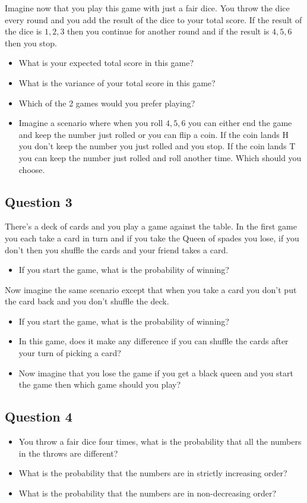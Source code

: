 \documentclass{article}
\begin{document}
Imagine now that you play this game with just a fair dice.
You throw the dice every round and you add the result of the dice to your total score.
If the result of the dice is $1,2,3$ then you continue for another round and if the result is $4,5,6$ then you stop.
\begin{itemize}
    \item What is your expected total score in this game?
    \item What is the variance of your total score in this game?
    \item Which of the 2 games would you prefer playing?
    \item Imagine a scenario where when you roll $4,5,6$ you can either end the game and keep the number just rolled or you can flip a coin. If the coin lands H you don't keep the number you just rolled and you stop. If the coin lands T you can keep the number just rolled and roll another time. Which should you choose.
\end{itemize}

\subsection{Question 3}
There's a deck of cards and you play a game against the table.
In the first game you each take a card in turn and if you take the Queen of spades you lose, if you don't then you shuffle the cards and your friend takes a card.
\begin{itemize}
    \item If you start the game, what is the probability of winning?
\end{itemize}
Now imagine the same scenario except that when you take a card you don't put the card back and you don't shuffle the deck.
\begin{itemize}
    \item If you start the game, what is the probability of winning?
    \item In this game, does it make any difference if you can shuffle the cards after your turn of picking a card?
    \item Now imagine that you lose the game if you get a black queen and you start the game then which game should you play?
\end{itemize}
\subsection{Question 4}
\begin{itemize}
    \item You throw a fair dice four times, what is the probability that all the numbers in the throws are different?
    \item What is the probability that the numbers are in strictly increasing order?
    \item What is the probability that the numbers are in non-decreasing order?
\end{itemize}
\end{document}
